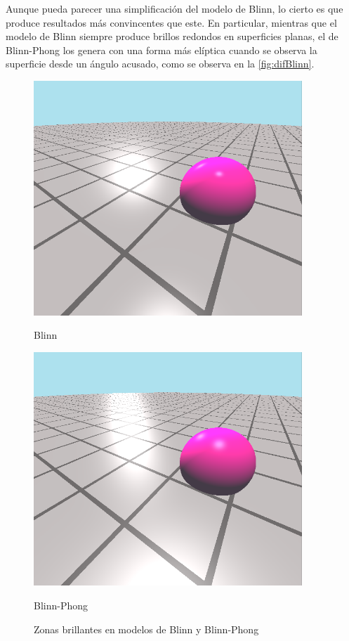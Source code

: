 Aunque pueda parecer una simplificación del modelo de Blinn, lo cierto es que produce resultados más convincentes que este. En particular, mientras que el modelo de Blinn siempre produce brillos redondos en superficies planas, el de Blinn-Phong los genera con una forma más elíptica cuando se observa la superficie desde un ángulo acusado, como se observa en la \autoref{fig:difBlinn}. 

\begin{figure}[!h]
     \begin{minipage}[c]{0.49\linewidth}
        \centering
        \includegraphics[width=0.9\textwidth]{Plantilla-TFG-master/img/compB.png}
        \caption{Blinn}
     \end{minipage}
     \begin{minipage}[c]{0.49\linewidth}
        \centering
        \includegraphics[width=0.9\textwidth]{Plantilla-TFG-master/img/compBP.png}
        \caption{Blinn-Phong}
     \end{minipage}
     \caption{Zonas brillantes en modelos de Blinn y Blinn-Phong}
     \label{fig:difBlinn}
\end{figure}

